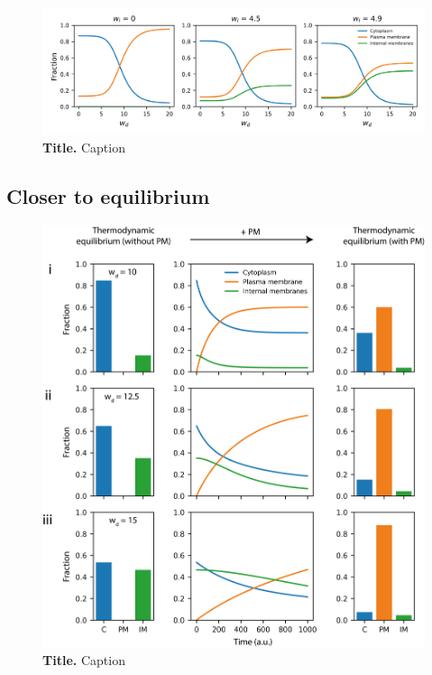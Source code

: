 \documentclass[12pt]{"article"}
\newcommand{\mycaption}[2]{\caption[#1]{\textbf{#1.} #2}}
\begin{document}
\begin{figure}[!h]
\includegraphics[scale=0.90]{six_species_thermodynamic}
\setlength{\abovecaptionskip}{20pt}
\centering
\mycaption{Title}{Caption}
\end{figure}



\subsection{Closer to equilibrium}


\begin{figure}[!h]
\includegraphics[scale=0.95]{three_surface_kinetic}
\setlength{\abovecaptionskip}{20pt}
\centering
\mycaption{Title}{Caption}
\end{figure}
\end{document}
